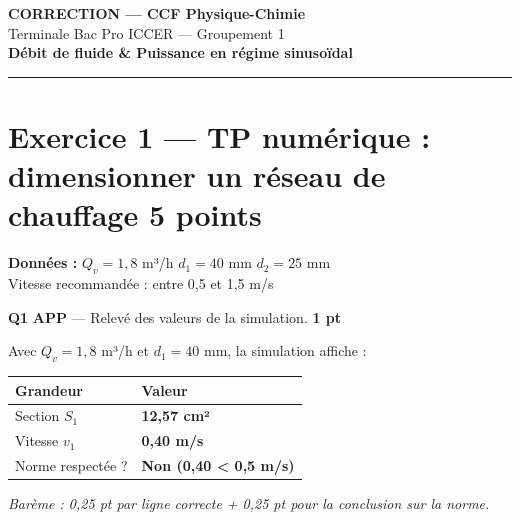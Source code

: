 \documentclass[a4paper,11pt]{article}
\newcommand{\pts}[1]{\hfill\textcolor{gris}{\small\textbf{#1}}}
\newcommand{\comp}[1]{\colorbox{blue!10}{\scriptsize\textbf{#1}}}
\begin{document}
\begin{center}
{\LARGE\bfseries\color{rouge} CORRECTION — CCF Physique-Chimie}\\[8pt]
{\large Terminale Bac Pro ICCER — Groupement 1}\\[8pt]
{\Large\bfseries Débit de fluide \& Puissance en régime sinusoïdal}\\[12pt]
\textcolor{rouge}{\rule{12cm}{1pt}}
\end{center}

\vspace{10pt}

\section*{Exercice 1 — TP numérique : dimensionner un réseau de chauffage \pts{5 points}}

\begin{contextebox}
\textbf{Données :} $Q_v = 1{,}8$ m³/h \quad $d_1 = 40$ mm \quad $d_2 = 25$ mm\\
Vitesse recommandée : entre 0,5 et 1,5 m/s
\end{contextebox}

\vspace{6pt}

\textbf{Q1} \comp{APP} — Relevé des valeurs de la simulation. \pts{1 pt}

\begin{corrbox}
Avec $Q_v = 1{,}8$ m³/h et $d_1 = 40$ mm, la simulation affiche :

\begin{center}
\renewcommand{\arraystretch}{1.5}
\begin{tabular}{|>{\centering\arraybackslash}m{4cm}|>{\centering\arraybackslash}m{4cm}|}
\hline
\textbf{Grandeur} & \textbf{Valeur} \\
\hline
Section $S_1$ & \textcolor{rouge}{\textbf{12,57 cm²}} \\
\hline
Vitesse $v_1$ & \textcolor{rouge}{\textbf{0,40 m/s}} \\
\hline
Norme respectée ? & \textcolor{rouge}{\textbf{Non (0,40 < 0,5 m/s)}} \\
\hline
\end{tabular}
\renewcommand{\arraystretch}{1}
\end{center}

\textit{Barème : 0,25 pt par ligne correcte + 0,25 pt pour la conclusion sur la norme.}
\end{corrbox}
\end{document}
